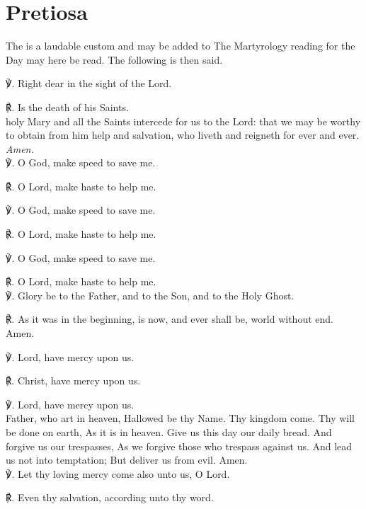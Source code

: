 \section{Pretiosa}
\fancyhead[RE,LO]{}
\begin{secrubric}
    The  is a laudable custom and may be added to  The Martyrology reading for the Day may here be read. The following is then said.
\end{secrubric}
\begin{multicols}{2}
℣. Right dear in the sight of the Lord.

℟. Is the death of his Saints.\\

 holy Mary and all the Saints intercede for us to the Lord: that we may be worthy to obtain from him help and salvation, who liveth and reigneth for ever and ever. \textit{Amen.}\\

℣. O God, {} make speed to save me.

℟. O Lord, make haste to help me.

℣. O God, {} make speed to save me.

℟. O Lord, make haste to help me.

℣. O God, {} make speed to save me.

℟. O Lord, make haste to help me.\\

℣. Glory be to the Father, and to the Son, and to the Holy Ghost.

℟. As it was in the beginning, is now, and ever shall be, world without end. Amen.

℣. Lord, have mercy upon us.

℟. Christ, have mercy upon us.

℣. Lord, have mercy upon us.\\

 Father, who art in heaven, Hallowed be thy Name. Thy kingdom come. Thy will be done on earth, As it is in heaven. Give us this day our daily bread. And forgive us our trespasses, As we forgive those who trespass against us. And lead us not into temptation; But deliver us from evil. Amen.\\

℣. Let thy loving mercy come also unto us, O Lord.

℟. Even thy salvation, according unto thy word.


\end{multicols}
